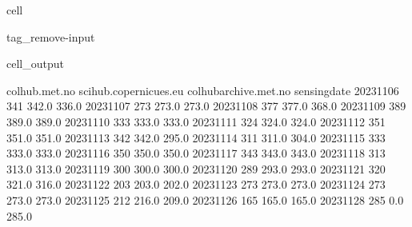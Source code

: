 \documentclass[letterpaper,10pt,english]{jupyterBook}
\begin{document}
\begin{sphinxuseclass}{cell}
\begin{sphinxuseclass}{tag_remove-input}\begin{sphinxVerbatimOutput}

\begin{sphinxuseclass}{cell_output}
\begin{sphinxVerbatim}[commandchars=\\\{\}]
              colhub.met.no  scihub.copernicues.eu  colhub\PYGZhy{}archive.met.no  \PYGZbs{}
sensing\PYGZus{}date                                                                
2023\PYGZhy{}11\PYGZhy{}06              341                  342.0                  336.0   
2023\PYGZhy{}11\PYGZhy{}07              273                  273.0                  273.0   
2023\PYGZhy{}11\PYGZhy{}08              377                  377.0                  368.0   
2023\PYGZhy{}11\PYGZhy{}09              389                  389.0                  389.0   
2023\PYGZhy{}11\PYGZhy{}10              333                  333.0                  333.0   
2023\PYGZhy{}11\PYGZhy{}11              324                  324.0                  324.0   
2023\PYGZhy{}11\PYGZhy{}12              351                  351.0                  351.0   
2023\PYGZhy{}11\PYGZhy{}13              342                  342.0                  295.0   
2023\PYGZhy{}11\PYGZhy{}14              311                  311.0                  304.0   
2023\PYGZhy{}11\PYGZhy{}15              333                  333.0                  333.0   
2023\PYGZhy{}11\PYGZhy{}16              350                  350.0                  350.0   
2023\PYGZhy{}11\PYGZhy{}17              343                  343.0                  343.0   
2023\PYGZhy{}11\PYGZhy{}18              313                  313.0                  313.0   
2023\PYGZhy{}11\PYGZhy{}19              300                  300.0                  300.0   
2023\PYGZhy{}11\PYGZhy{}20              289                  293.0                  293.0   
2023\PYGZhy{}11\PYGZhy{}21              320                  321.0                  316.0   
2023\PYGZhy{}11\PYGZhy{}22              203                  203.0                  202.0   
2023\PYGZhy{}11\PYGZhy{}23              273                  273.0                  273.0   
2023\PYGZhy{}11\PYGZhy{}24              273                  273.0                  273.0   
2023\PYGZhy{}11\PYGZhy{}25              212                  216.0                  209.0   
2023\PYGZhy{}11\PYGZhy{}26              165                  165.0                  165.0   
2023\PYGZhy{}11\PYGZhy{}28              285                    0.0                  285.0   

\end{sphinxVerbatim}
\end{sphinxuseclass}
\end{sphinxVerbatimOutput}
\end{sphinxuseclass}
\end{sphinxuseclass}
\end{document}
